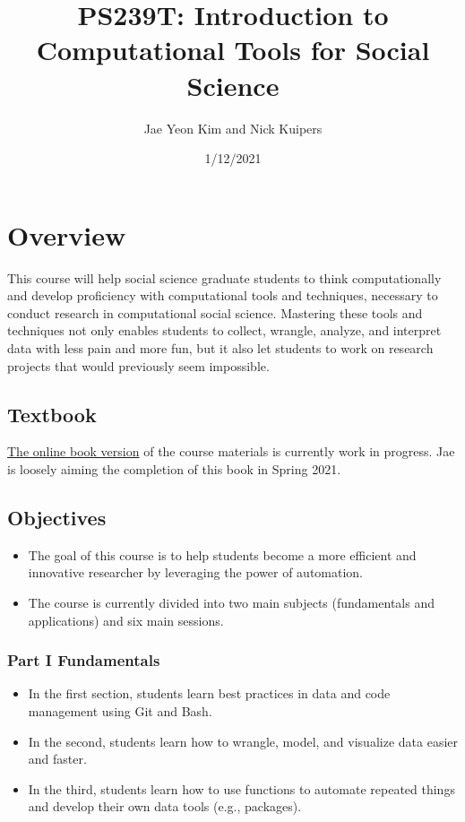 \documentclass[
]{article}
\title{PS239T: Introduction to Computational Tools for Social Science}
\author{Jae Yeon Kim and Nick Kuipers}
\date{1/12/2021}
\begin{document}
\maketitle

\hypertarget{overview}{%
\section{Overview}\label{overview}}

This course will help social science graduate students to think
computationally and develop proficiency with computational tools and
techniques, necessary to conduct research in computational social
science. Mastering these tools and techniques not only enables students
to collect, wrangle, analyze, and interpret data with less pain and more
fun, but it also let students to work on research projects that would
previously seem impossible.

\hypertarget{textbook}{%
\subsection{Textbook}\label{textbook}}

\href{https://jaeyk.github.io/PS239T/}{The online book version} of the
course materials is currently work in progress. Jae is loosely aiming
the completion of this book in Spring 2021.

\hypertarget{objectives}{%
\subsection{Objectives}\label{objectives}}

\begin{itemize}
\item
  The goal of this course is to help students become a more efficient
  and innovative researcher by leveraging the power of automation.
\item
  The course is currently divided into two main subjects (fundamentals
  and applications) and six main sessions.
\end{itemize}

\hypertarget{part-i-fundamentals}{%
\subsubsection{Part I Fundamentals}\label{part-i-fundamentals}}

\begin{itemize}
\item
  In the first section, students learn best practices in data and code
  management using Git and Bash.
\item
  In the second, students learn how to wrangle, model, and visualize
  data easier and faster.
\item
  In the third, students learn how to use functions to automate repeated
  things and develop their own data tools (e.g., packages).
\end{itemize}
\end{document}
